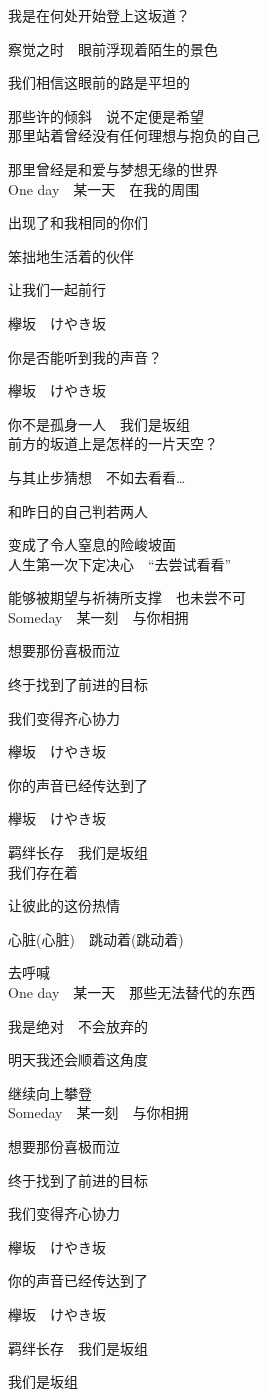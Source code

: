我是在何处开始登上这坂道？

察觉之时　眼前浮现着陌生的景色

我们相信这眼前的路是平坦的

那些许的倾斜　说不定便是希望
\\

那里站着曾经没有任何理想与抱负的自己

那里曾经是和爱与梦想无缘的世界
\\

One day　某一天　在我的周围

出现了和我相同的你们

笨拙地生活着的伙伴

让我们一起前行

欅坂　けやき坂

你是否能听到我的声音？

欅坂　けやき坂

你不是孤身一人　我们是坂组
\\

前方的坂道上是怎样的一片天空？

与其止步猜想　不如去看看…

和昨日的自己判若两人

变成了令人窒息的险峻坡面
\\

人生第一次下定决心　“去尝试看看”

能够被期望与祈祷所支撑　也未尝不可
\\

Someday　某一刻　与你相拥

想要那份喜极而泣

终于找到了前进的目标

我们变得齐心协力

欅坂　けやき坂

你的声音已经传达到了

欅坂　けやき坂

羁绊长存　我们是坂组
\\

我们存在着

让彼此的这份热情

心脏(心脏)　跳动着(跳动着)

去呼喊
\\

One day　某一天　那些无法替代的东西

我是绝对　不会放弃的

明天我还会顺着这角度

继续向上攀登
\\

Someday　某一刻　与你相拥

想要那份喜极而泣

终于找到了前进的目标

我们变得齐心协力

欅坂　けやき坂

你的声音已经传达到了

欅坂　けやき坂

羁绊长存　我们是坂组

我们是坂组
\\